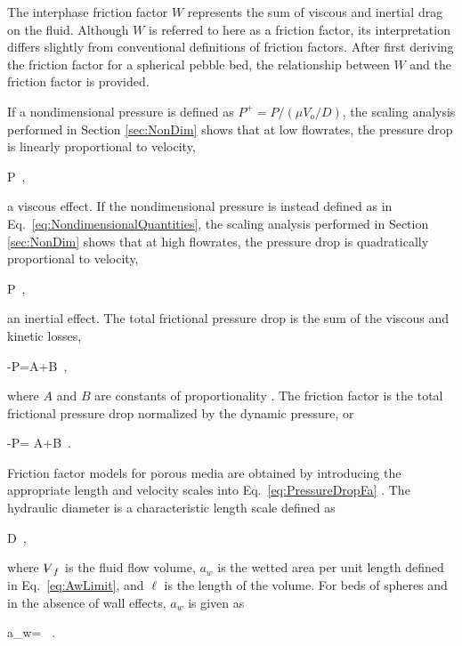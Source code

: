 The interphase friction factor \(W\) represents the sum of viscous and inertial drag on the fluid. Although \(W\) is referred to here as a friction factor, its interpretation differs slightly from conventional definitions of friction factors. After first deriving the friction factor for a spherical pebble bed, the relationship between \(W\) and the friction factor is provided.

If a nondimensional pressure is defined as \(P^+=P/(\mu V_o/D)\), the scaling analysis performed in Section \ref{sec:NonDim} shows that at low flowrates, the pressure drop is linearly proportional to velocity,

\beq
\label{eq:FrictionDragProportionality}
\nabla P\propto{}\ ,
\eeq

\noindent a viscous effect. If the nondimensional pressure is instead defined as in Eq.\ \eqref{eq:NondimensionalQuantities}, the scaling analysis performed in Section \ref{sec:NonDim} shows that at high flowrates, the pressure drop is quadratically proportional to velocity,

\beq
\label{eq:FormDragProportionality}
\nabla P\propto{}\ ,
\eeq

\noindent an inertial effect. The total frictional pressure drop is the sum of the viscous and kinetic losses,

\beq
\label{eq:TotalPressureDrop}
-\nabla P=A+B\ ,
\eeq

\noindent where \(A\) and \(B\) are constants of proportionality \cite{macdonald}. The friction factor is the total frictional pressure drop normalized by the dynamic pressure, or

\beq
\label{eq:PressureDropFa}
-\nabla P= A+B\ .
\eeq

\noindent Friction factor models for porous media are obtained by introducing the appropriate length and velocity scales into Eq.\ \eqref{eq:PressureDropFa} \cite{ergun}. The hydraulic diameter is a characteristic length scale defined as

\beq
\label{eq:Dh_generic}
D\equiv{}\ ,
\eeq

\noindent where \(\volume_f\) is the fluid flow volume, \(a_w\) is the wetted area per unit length defined in Eq.\ \eqref{eq:AwLimit}, and \(\ell\) is the length of the volume. For beds of spheres and in the absence of wall effects, \(a_w\) is given as \cite{achenbach}

\beq
\label{eq:a_V}
a_w= \ .
\eeq

